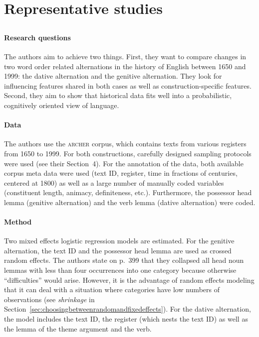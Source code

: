 \documentclass[a4paper,12pt]{article}
\begin{document}
\section{Representative studies}

\begin{mdframed}
  \subsection*{\citet{WolkEa2013}}
  
  \paragraph{Research questions}

  The authors aim to achieve two things.
  First, they want to compare changes in two word order related alternations in the history of English between 1650 and 1999: the dative alternation and the genitive alternation.
  They look for influencing features shared in both cases as well as construction-specific features.
  Second, they aim to show that historical data fits well into a probabilistic, cognitively oriented view of language.

  \paragraph{Data}

  The authors use the \textsc{archer} corpus, which contains texts from various registers from 1650 to 1999.
  For both constructions, carefully designed sampling protocols were used (see their Section~4).
  For the annotation of the data, both available corpus meta data were used (text ID, register, time in fractions of centuries, centered at 1800) as well as a large number of manually coded variables (constituent length, animacy, definiteness, etc.).
  Furthermore, the possessor head lemma (genitive alternation) and the verb lemma (dative alternation) were coded.

  \paragraph{Method}

  Two mixed effects logistic regression models are estimated.
  For the genitive alternation, the text ID and the possessor head lemma are used as crossed random effects.
  The authors state on p.~399 that they collapsed all head noun lemmas with less than four occurrences into one category because otherwise ``difficulties'' would arise.
  However, it is the advantage of random effects modeling that it can deal with a situation where categories have low numbers of observations (see \textit{shrinkage} in Section~\ref{sec:choosingbetweenrandomandfixedeffects}).
  For the dative alternation, the model includes the text ID, the register (which nests the text ID) as well as the lemma of the theme argument and the verb. 


\end{mdframed}
\end{document}

